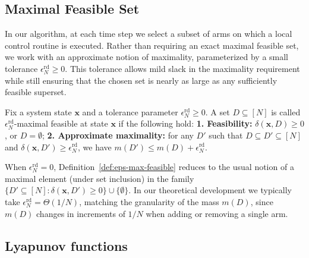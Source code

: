 \documentclass[mnsc,nonblindrev]{informs3}
\newcommand{\bmx}{\bm{x}}
\begin{document}
\begin{APPENDICES}
\subsection{Maximal Feasible Set}\label{subsec:max-feasible}

In our algorithm, at each time step we select a subset of arms on which a local control routine is executed. Rather than requiring an exact maximal feasible set, we work with an approximate notion of maximality, parameterized by a small
tolerance $\epsilon_N^{\mathrm{rd}}\ge 0$. This tolerance allows mild slack in the maximality requirement while still ensuring that the chosen set is nearly as large as any sufficiently feasible superset.
\begin{definition}
\label{def:eps-max-feasible}
Fix a system state $\bmx$ and a tolerance parameter $\epsilon_N^{\mathrm{rd}}\ge 0$.
A set $D\subseteq[N]$ is called $\epsilon_N^{\mathrm{rd}}$-maximal feasible at state $\bmx$ if the following hold:
\textbf{1. Feasibility:} $\delta(\bmx,D)\ge 0$, or $D=\emptyset$;
\textbf{2. Approximate maximality:} for any $D'$ such that $D\subseteq D'\subseteq[N]$ and
  $\delta(\bmx,D')\ge \epsilon_N^{\mathrm{rd}}$, we have
  $
    m(D') \le m(D)+\epsilon_N^{\mathrm{rd}}.
  $
\end{definition}

When $\epsilon_N^{\mathrm{rd}}=0$, Definition~\ref{def:eps-max-feasible} reduces to the usual notion of a
maximal element (under set inclusion) in the family
$\{D'\subseteq[N]:\delta(\bmx,D')\ge 0\}\cup\{\emptyset\}$.
In our theoretical development we typically take $\epsilon_N^{\mathrm{rd}}=\Theta(1/N)$, matching the
granularity of the mass $m(D)$, since $m(D)$ changes in increments of $1/N$ when adding or removing a
single arm.


\subsection{Lyapunov functions}\label{subsec:lyf-RB}


\end{APPENDICES}
\end{document}
